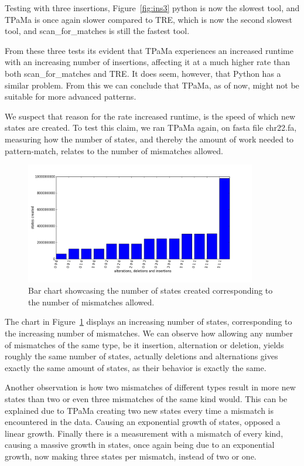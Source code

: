 Testing with three insertions, Figure~\ref{fig:ins3} python is now the slowest tool, and TPaMa is once again slower compared to TRE, which is now the second slowest tool, and scan\_for\_matches is still the fastest tool.

From these three tests its evident that TPaMa experiences an increased runtime with an increasing number of insertions, affecting it at a much higher rate than both scan\_for\_matches and TRE. It does seem, however, that Python has a similar problem. From this we can conclude that TPaMa, as of now, might not be suitable for more advanced patterns.

We suspect that reason for the rate increased runtime, is the speed of which new states are created. To test this claim, we ran TPaMa again, on fasta file chr22.fa, measuring how the number of states, and thereby the amount of work needed to pattern-match, relates to the number of mismatches allowed.

\begin{figure}[h!]
\centering
\includegraphics[width=0.9\textwidth]{Benchmarking/states_graph.png}
\caption{Bar chart showcasing the number of states created corresponding to the number of mismatches allowed.}
\label{fig:statesgraph}
\end{figure}

The chart in Figure~\ref{fig:statesgraph} displays an increasing number of states, corresponding to the increasing number of mismatches. We can observe how allowing any number of mismatches of the same type, be it insertion, alternation or deletion, yields roughly the same number of states, actually deletions and alternations gives exactly the same amount of states, as their behavior is exactly the same.

Another observation is how two mismatches of different types result in more new states than two or even three mismatches of the same kind would. This can be explained due to TPaMa creating two new states every time a mismatch is encountered in the data. Causing an exponential growth of states, opposed a linear growth. Finally there is a measurement with a mismatch of every kind, causing a massive growth in states, once again being due to an exponential growth, now making three states per mismatch, instead of two or one.  


